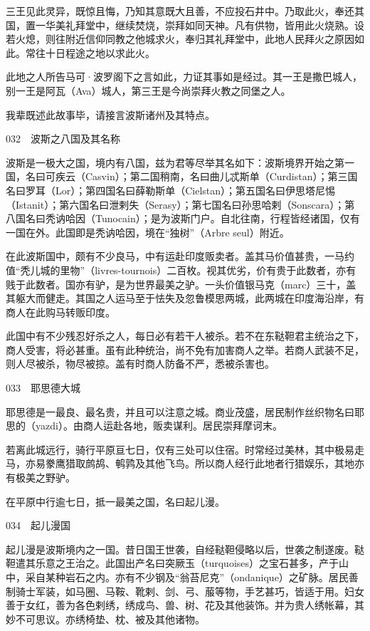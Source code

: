 \documentclass[12pt,UTF8]{ctexbook}
\begin{document}
三王见此灵异，既惊且悔，乃知其意既大且善，不应投石井中。乃取此火，奉还其国，置一华美礼拜堂中，继续焚烧，崇拜如同天神。凡有供物，皆用此火烧熟。设若火熄，则往附近信仰同教之他城求火，奉归其礼拜堂中，此地人民拜火之原因如此。常往十日程途之地以求此火。

此地之人所告马可·波罗阁下之言如此，力证其事如是经过。其一王是撒巴城人，别一王是阿瓦（Ava）城人，第三王是今尚崇拜火教之同堡之人。

我辈既述此故事毕，请接言波斯诸州及其特点。





032　波斯之八国及其名称

波斯是一极大之国，境内有八国，兹为君等尽举其名如下：波斯境界开始之第一国，名曰可疾云（Casvin）；第二国稍南，名曰曲儿忒斯单（Curdistan）；第三国名曰罗耳（Lor）；第四国名曰薛勒斯单（Cielstan）；第五国名曰伊思塔尼惕（Istanit）；第六国名曰泄剌失（Serasy）；第七国名曰孙思哈剌（Sonscara）；第八国名曰秃讷哈因（Tunocain）；是为波斯门户。自北往南，行程皆经诸国，仅有一国在外。此国即是秃讷哈因，境在“独树”（Arbre seul）附近。

在此波斯国中，颇有不少良马，中有运赴印度贩卖者。盖其马价值甚贵，一马约值“秃儿城的里物”（livres-tournois）二百枚。视其优劣，价有贵于此数者，亦有贱于此数者。国亦有驴，是为世界最美之驴。一头价值银马克（marc）三十，盖其躯大而健走。其国之人运马至于怯失及忽鲁模思两城，此两城在印度海沿岸，有商人在此购马转贩印度。

此国中有不少残忍好杀之人，每日必有若干人被杀。若不在东鞑靼君主统治之下，商人受害，将必甚重。虽有此种统治，尚不免有加害商人之举。若商人武装不足，则人尽被杀，物尽被掠。盖有时商人防备不严，悉被杀害也。





033　耶思德大城

耶思德是一最良、最名贵，并且可以注意之城。商业茂盛，居民制作丝织物名曰耶思的（yazdi）。由商人运赴各地，贩卖谋利。居民崇拜摩诃末。

若离此城远行，骑行平原亘七日，仅有三处可以住宿。时常经过美林，其中极易走马，亦易豢鹰猎取鹧鸪、鹌鹑及其他飞鸟。所以商人经行此地者行猎娱乐，其地亦有极美之野驴。

在平原中行逾七日，抵一最美之国，名曰起儿漫。





034　起儿漫国

起儿漫是波斯境内之一国。昔日国王世袭，自经鞑靼侵略以后，世袭之制遂废。鞑靼遣其乐意之王治之。此国出产名曰突厥玉（turquoises）之宝石甚多，产于山中，采自某种岩石之内。亦有不少钢及“翁苔尼克”（ondanique）之矿脉。居民善制骑士军装，如马圈、马鞍、靴剌、剑、弓、菔等物，手艺甚巧，皆适于用。妇女善于女红，善为各色剌绣，绣成鸟、兽、树、花及其他装饰。并为贵人绣帐幕，其妙不可思议。亦绣椅垫、枕、被及其他诸物。
\end{document}
